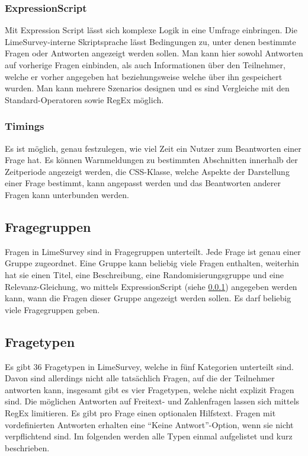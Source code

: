 \subsubsection{ExpressionScript}
\label{m:expr_script}
Mit Expression Script lässt sich komplexe Logik in eine Umfrage einbringen.
Die LimeSurvey-interne Skriptsprache lässt Bedingungen zu, unter denen bestimmte Fragen oder Antworten angezeigt werden sollen.
Man kann hier sowohl Antworten auf vorherige Fragen einbinden, als auch Informationen über den Teilnehmer, welche er vorher angegeben hat beziehungsweise welche über ihn gespeichert wurden.
Man kann mehrere Szenarios designen und es sind Vergleiche mit den Standard-Operatoren sowie RegEx möglich.

\subsubsection{Timings}

Es ist möglich, genau festzulegen, wie viel Zeit ein Nutzer zum Beantworten einer Frage hat.
Es können Warnmeldungen zu bestimmten Abschnitten innerhalb der Zeitperiode angezeigt werden, die CSS-Klasse, welche Aspekte der Darstellung einer Frage bestimmt, kann angepasst werden und das Beantworten anderer Fragen kann unterbunden werden.

\subsection{Fragegruppen}

Fragen in LimeSurvey sind in Fragegruppen unterteilt. Jede Frage ist genau einer Gruppe zugeordnet.
Eine Gruppe kann beliebig viele Fragen enthalten, weiterhin hat sie einen Titel, eine Beschreibung, eine Randomisierungsgruppe und eine Relevanz-Gleichung, wo mittels ExpressionScript (siehe \cref{m:expr_script}) angegeben werden kann, wann die Fragen dieser Gruppe angezeigt werden sollen.
Es darf beliebig viele Fragegruppen geben.

\subsection{Fragetypen}

Es gibt 36 Fragetypen in LimeSurvey, welche in fünf Kategorien unterteilt sind.
Davon sind allerdings nicht alle tatsächlich Fragen, auf die der Teilnehmer antworten kann, insgesamt gibt es vier Fragetypen, welche nicht explizit Fragen sind. %
Die möglichen Antworten auf Freitext- und Zahlenfragen lassen sich mittels RegEx limitieren.
Es gibt pro Frage einen optionalen Hilfstext.
Fragen mit vordefinierten Antworten erhalten eine \enquote{Keine Antwort}-Option, wenn sie nicht verpflichtend sind.
Im folgenden werden alle Typen einmal aufgelistet und kurz beschrieben.



